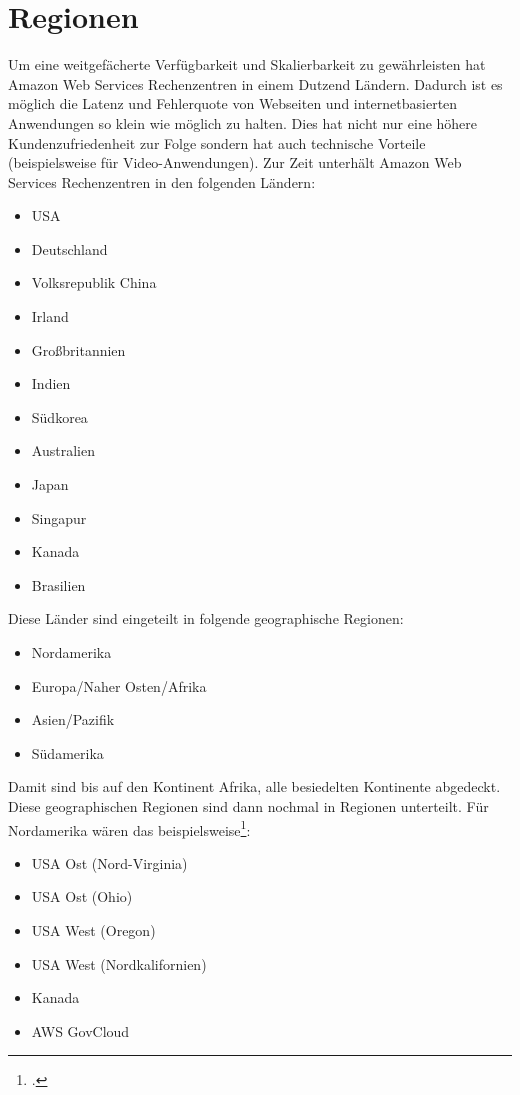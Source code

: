 \documentclass[titlepage]{report}
\begin{document}
\section{Regionen}
Um eine weitgefächerte Verfügbarkeit und Skalierbarkeit zu gewährleisten
hat Amazon Web Services Rechenzentren in einem Dutzend Ländern. Dadurch
ist es möglich die Latenz und Fehlerquote von Webseiten und internetbasierten
Anwendungen so klein wie möglich zu halten. Dies hat nicht nur eine
höhere Kundenzufriedenheit zur Folge sondern hat auch technische
Vorteile (beispielsweise für Video\hyp{}Anwendungen). Zur Zeit unterhält
Amazon Web Services Rechenzentren in den folgenden Ländern:
\begin{itemize}
    \item USA
    \item Deutschland
    \item Volksrepublik China
    \item Irland
    \item Großbritannien
    \item Indien
    \item Südkorea
    \item Australien
    \item Japan
    \item Singapur
    \item Kanada
    \item Brasilien
\end{itemize}
Diese Länder sind eingeteilt in folgende geographische Regionen:
\begin{itemize}
    \item Nordamerika
    \item Europa/Naher Osten/Afrika
    \item Asien/Pazifik
    \item Südamerika
\end{itemize}
Damit sind bis auf den Kontinent Afrika, alle besiedelten Kontinente
abgedeckt. Diese geographischen Regionen sind dann nochmal in Regionen
unterteilt. Für Nordamerika wären das beispielsweise\footcite{region}:
\begin{itemize}
    \item USA Ost (Nord\hyp{}Virginia)
    \item USA Ost (Ohio)
    \item USA West (Oregon)
    \item USA West (Nordkalifornien)
    \item Kanada
    \item AWS GovCloud
\end{itemize}
\end{document}
